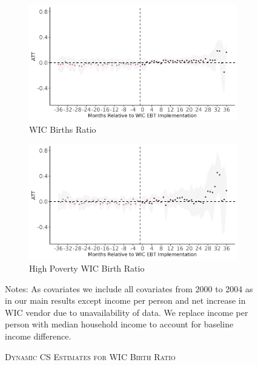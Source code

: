 \begin{figure}[!htbp]
	\begin{subfigure}[t]{.5\textwidth}
		\centering
		\includegraphics[width=\textwidth]{wic_tx_cs_es_frac_mom_wic.png}  
		\caption{WIC Births Ratio}
		\label{mk_es1}
	\end{subfigure}
	\begin{subfigure}[t]{.5\textwidth}
		\centering
		\includegraphics[width=\textwidth]{wic_tx_cs_es_frac_poor_wic.png}  
		\caption{High Poverty WIC Birth Ratio}
		\label{mk_es2}
	\end{subfigure}
	\caption{\textsc{Dynamic CS Estimates for WIC Birth Ratio}}
	\label{mk_es}
	\footnotesize
	\vspace{6pt}
	\vspace{4pt}
	Notes: As covariates we include all covariates from 2000 to 2004 as in our main results except income per person and net increase in WIC vendor due to unavailability of data. We replace income per person with median household income to account for baseline income difference.
\end{figure}

